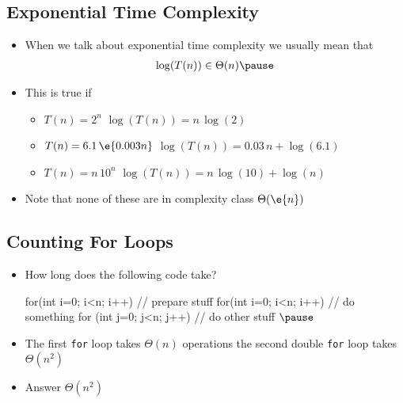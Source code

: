 \begin{slide}
\section[-1]{Exponential Time Complexity}

\begin{PauseHighLight}
  \begin{itemize}
  \item When we talk about exponential time complexity we usually mean
    that
    \begin{align*}
      \log(T(n)) \in \Theta(n) \pause
    \end{align*}
  \item This is true if
    \begin{itemize}
    \item $T(n) = 2^n$ \pause{} \hspace{1em} $\log(T(n)) =
      n\,\log(2)$ \pauseb
    \item {}$T(n) = 6.1\,\e{0.003n}$\pause{} \hspace{1em} $\log(T(n)) =
      0.03\,n + \log(6.1)$ \pauseb
    \item {}$T(n) = n \, 10^n$\pause\pause{} \hspace{1em} $\log(T(n)) =
      n\,\log(10) + \log(n)$ \pauseb
    \end{itemize}
  \item Note that none of these are in complexity class $\Theta(\e{n})$\pause
  \end{itemize}
\end{PauseHighLight}

\end{slide}


\Outline %

\begin{slide}
\section[-1]{Counting For Loops}

\begin{PauseHighLight}
  \begin{itemize}
  \item How long does the following code take?
\begin{java}
for(int i=0; i<n; i++)  {
  // prepare stuff
}
for(int i=0; i<n; i++)  {
  // do something
  for (int j=0; j<n; j++) {
    // do other stuff
  }
} $\pause$
\end{java}
\item The first \texttt{for} loop takes $\Theta(n)$ operations the
  second double \texttt{for} loop takes $\Theta(n^2)$\pauseb
\item Answer $\Theta(n^2)$\pauseb
  \end{itemize}
\end{PauseHighLight}

\end{slide}

